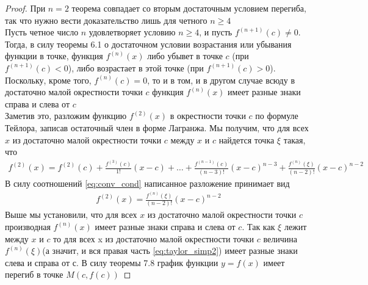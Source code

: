 \documentclass[10pt]{article}
\begin{document}
    \begin{proof}
        При $n=2$ теорема совпадает со вторым достаточным условием перегиба, так что нужно вести доказательство лишь для четного $n \geq 4$\\
        Пусть четное число $n$ удовлетворяет условию $n \geq 4$, и пусть $f^{(n+1)}(c) \neq 0$. Тогда, в силу теоремы 6.1 о достаточном условии возрастания или убывания функции в точке, функция $f^{(n)}(x)$ либо убывет в точке $c$ (при $f^{(n+1)}(c) < 0$), либо возрастает в этой точке (при $f^{(n+1)}(c) > 0$). Поскольку, кроме того, $f^{(n)}(c) = 0$, то и в том, и в другом случае всюду в достаточно малой окрестности точки $c$ функция $f^{(n)}(x)$ имеет разные знаки справа и слева от $c$\\
        Заметив это, разложим функцию $f^{(2)}(x)$ в окрестности точки $c$ по формуле Тейлора, записав остаточный член в форме Лагранжа. Мы получим, что для всех $x$ из достаточно малой окрестности точки $c$ между $x$ и $c$ найдется точка $\xi$ такая, что
        \begin{gather*}
            f^{(2)}(x) = f^{(2)}(c) + \frac{f^{(3)}(c)}{1!}(x-c) + \ldots + \frac{f^{(n-1)}(c)}{(n-3)!}(x-c)^{n-3} + \frac{f^{(n)}(\xi)}{(n-2)!}(x-c)^{n-2}
        \end{gather*}
        В силу соотношений \ref{eq:conv_cond} написанное разложение принимает вид
        \begin{gather}
            f^{(2)}(x) = \frac{f^{(n)}(\xi)}{(n-2)!}(x-c)^{n-2} \label{eq:taylor_simp2}
        \end{gather}
        Выше мы установили, что для всех $x$ из достаточно малой окрестности точки $c$ производная $f^{(n)}(x)$ имеет разные знаки справа и слева от $c$. Так как $\xi$ лежит между $x$ и $c$ то для всех x из достаточно малой окрестности точки $c$ величина $f^{(n)}(\xi)$(а значит, и вся правая часть \ref{eq:taylor_simp2}) имеет разные знаки слева и справа от $с$. В силу теоремы 7.8 график функции $y = f(x)$ имеет перегиб в точке $M(c, f(c))$
    \end{proof}
\end{document}
